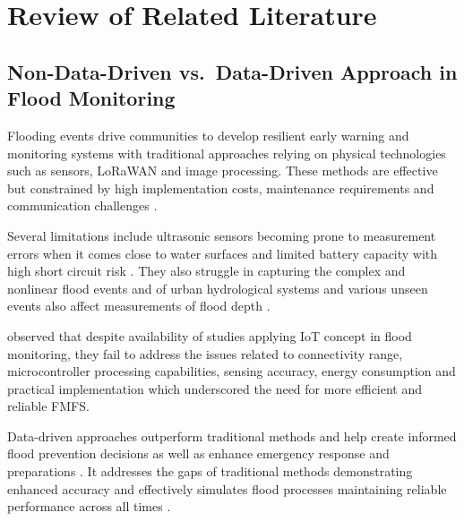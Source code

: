 \documentclass{research}
\begin{document}
\section{Review of Related Literature}

\subsection*{Non-Data-Driven vs.\ Data-Driven Approach in Flood Monitoring}

Flooding events drive communities to develop resilient early warning and monitoring systems with traditional approaches relying on physical technologies such as sensors, LoRaWAN and image processing. These methods are effective but constrained by high implementation costs, maintenance requirements and communication challenges \cite{tao2024review,bukhari2025review,dondang2021design,tolentino2022real}.

Several limitations include ultrasonic sensors becoming prone to measurement errors when it comes close to water surfaces \cite{te2024smart} and limited battery capacity with high short circuit risk \cite{zhao2025water}. They also struggle in capturing the complex and nonlinear flood events \cite{linus2024performance} and of urban hydrological systems \cite{ye2025capturing} and various unseen events also affect measurements of flood depth \cite{liu2025comprehensive}.

\cite{zakaria2023development} observed that despite availability of studies applying IoT concept in flood monitoring, they fail to address the issues related to connectivity range, microcontroller processing capabilities, sensing accuracy, energy consumption and practical implementation which underscored the need for more efficient and reliable FMFS.

Data-driven approaches outperform traditional methods \cite{an2025hybrid} and help create informed flood prevention decisions \cite{aldhafiri2025leveraging,xu2024hybrid} as well as enhance emergency response and preparations \cite{yi2024reservoir}. It addresses the gaps of traditional methods \cite{rathnasiri2023datadriven} demonstrating enhanced accuracy \cite{aravamudan2025superresolution} and effectively simulates flood processes \cite{tang2023flood} maintaining reliable performance across all times \cite{asif2025review}.
\end{document}
